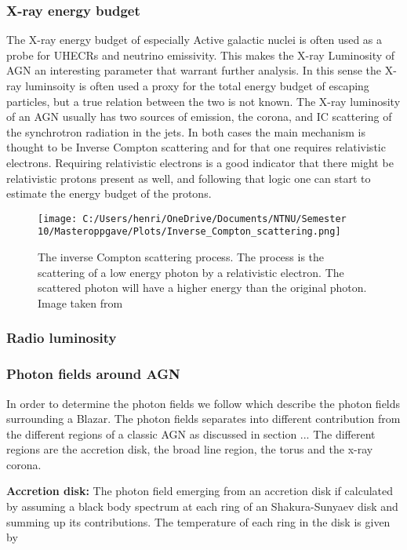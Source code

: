 \subsubsection{X-ray energy budget}
The X-ray energy budget of especially Active galactic nuclei is often used as a probe for UHECRs and neutrino emissivity. This makes the X-ray Luminosity of AGN an interesting parameter that warrant further analysis. In this sense the X-ray luminsoity is often used a proxy for the total energy budget of escaping particles, but a true relation between the two is not known. The X-ray luminosity of an AGN usually has two sources of emission, the corona, and IC scattering of the synchrotron radiation in the jets. In both cases the main mechanism is thought to be Inverse Compton scattering and for that one requires relativistic electrons. Requiring relativistic electrons is a good indicator that there might be relativistic protons present as well, and following that logic one can start to estimate the energy budget of the protons. 


\begin{figure}
    \centering
    \texttt{[image: C:/Users/henri/OneDrive/Documents/NTNU/Semester 10/Masteroppgave/Plots/Inverse\_Compton\_scattering.png]}
    \caption{The inverse Compton scattering process. The process is the scattering of a low energy photon by a relativistic electron. The scattered photon will have a higher energy than the original photon. Image taken from \cite{BennumAlfred}}
\end{figure}
\subsubsection{Radio luminosity}
\subsubsection{Photon fields around AGN}
\label{sec:photon_fields}

In order to determine the photon fields we follow \cite{Ghisellini_2009} which describe the photon fields surrounding a Blazar. The photon fields separates into different contribution from the different regions of a classic AGN as discussed in section ... 
The different regions are the accretion disk, the broad line region, the torus and the x-ray corona. 


\textbf{Accretion disk:} The photon field emerging from an accretion disk if calculated by assuming a black body spectrum at each ring of an Shakura-Sunyaev disk and summing up its contributions. The temperature of 
each ring in the disk is given by 

